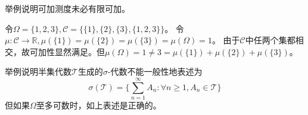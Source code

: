 \documentclass{ctexart}
\begin{document}
\begin{problem}\label{pro:1.4.11}
  举例说明可加测度未必有限可加。
\end{problem}
\begin{solution}
  令\(\Omega=\{1,2,3\},\mathcal{C}=\{\{1\},\{2\},\{3\},\{1,2,3\}\} \)。
  令\(\mu:\mathcal{C} \to \mathbb{R},\mu(\{1\})=\mu(\{2\})=\mu(\{3\})=\mu(\Omega)=1 \)。
  由于\(\mathcal{C} \)中任两个集都相交，故可加性显然满足。但\(\mu(\Omega)=1 \neq 3 = \mu(\{1\})+\mu(\{2\})+\mu(\{3\}) \)。
\end{solution}

\begin{problem}\label{pro:1.4.12}
  举例说明半集代数\(\mathcal{T}\)生成的\(\sigma\)-代数不能一般性地表述为
  \[
    \sigma(\mathcal{T})=\{\sum_{n=1}^{\infty} A_n:\forall n \geq 1, A_n \in \mathcal{T}\}
  \]
  但如果\(\Omega\)至多可数时，如上表述是正确的。
\end{problem}
\end{document}
